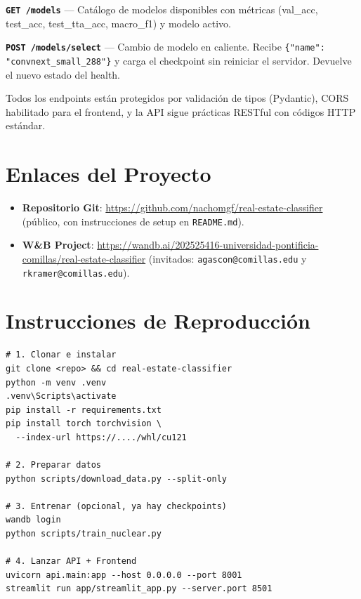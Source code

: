 \documentclass[10pt,a4paper,twocolumn]{article}
\begin{document}
\noindent\textbf{\texttt{GET /models}} --- Catálogo de modelos disponibles con métricas (val\_acc, test\_acc, test\_tta\_acc, macro\_f1) y modelo activo.

\noindent\textbf{\texttt{POST /models/select}} --- Cambio de modelo en caliente. Recibe \texttt{\{"name": "convnext\_small\_288"\}} y carga el checkpoint sin reiniciar el servidor. Devuelve el nuevo estado del health.

\noindent Todos los endpoints están protegidos por validación de tipos (Pydantic), CORS habilitado para el frontend, y la API sigue prácticas RESTful con códigos HTTP estándar.

\section{Enlaces del Proyecto}

\begin{itemize}
    \item \textbf{Repositorio Git}: \url{https://github.com/nachomgf/real-estate-classifier} (público, con instrucciones de setup en \texttt{README.md}).
    \item \textbf{W\&B Project}: \url{https://wandb.ai/202525416-universidad-pontificia-comillas/real-estate-classifier} (invitados: \texttt{agascon@comillas.edu} y \texttt{rkramer@comillas.edu}).
\end{itemize}

\section{Instrucciones de Reproducción}

\begin{verbatim}
# 1. Clonar e instalar
git clone <repo> && cd real-estate-classifier
python -m venv .venv
.venv\Scripts\activate
pip install -r requirements.txt
pip install torch torchvision \
  --index-url https://..../whl/cu121

# 2. Preparar datos
python scripts/download_data.py --split-only

# 3. Entrenar (opcional, ya hay checkpoints)
wandb login
python scripts/train_nuclear.py

# 4. Lanzar API + Frontend
uvicorn api.main:app --host 0.0.0.0 --port 8001
streamlit run app/streamlit_app.py --server.port 8501
\end{verbatim}
\end{document}

